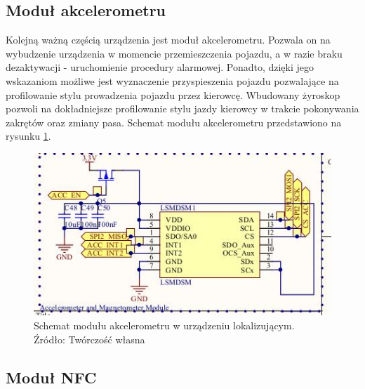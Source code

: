 \subsection{Moduł akcelerometru}

Kolejną ważną częścią urządzenia jest moduł akcelerometru. Pozwala on na wybudzenie urządzenia w momencie przemieszczenia pojazdu, a w razie braku dezaktywacji - uruchomienie procedury alarmowej. Ponadto, dzięki jego wskazaniom możliwe jest wyznaczenie przyspieszenia pojazdu pozwalające na profilowanie stylu prowadzenia pojazdu przez kierowcę. Wbudowany żyroskop pozwoli na dokładniejsze profilowanie stylu jazdy kierowcy w trakcie pokonywania zakrętów oraz zmiany pasa.
Schemat modułu akcelerometru przedstawiono na rysunku \ref{fig:image_mainboard_functional_accelerometer}.

\begin{figure}[H]
	\centering
	\includegraphics[width=15cm]{img/schematics/mainboard_functional_accelerometer.jpg}
	\caption{Schemat modułu akcelerometru w urządzeniu lokalizującym. \\ Źródło: Twórczość własna}
	\label{fig:image_mainboard_functional_accelerometer}
\end{figure}

\subsection{Moduł NFC}

